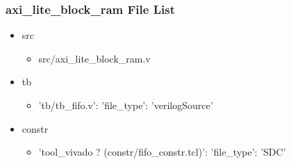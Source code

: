 \subsubsection{axi\_lite\_block\_ram File List}
\begin{itemize}
\item src
	\begin{itemize}
	\item src/axi\_lite\_block\_ram.v
	\end{itemize}
\item tb
	\begin{itemize}
	\item {'tb/tb\_fifo.v': {'file\_type': 'verilogSource'}}
	\end{itemize}
\item constr
	\begin{itemize}
	\item {'tool\_vivado ? (constr/fifo\_constr.tcl)': {'file\_type': 'SDC'}}
	\end{itemize}
\end{itemize}
